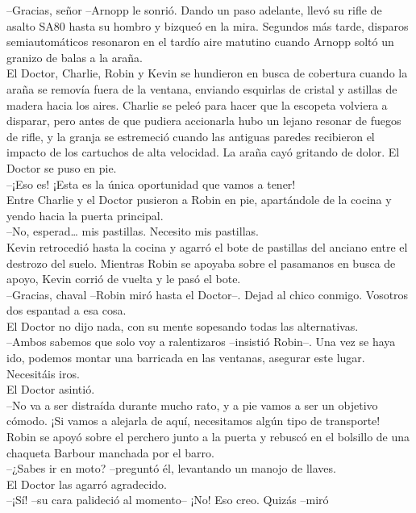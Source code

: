 --Gracias, señor --Arnopp le sonrió. Dando un paso adelante, llevó su
rifle de asalto SA80 hasta su hombro y bizqueó en la mira. Segundos más
tarde, disparos semiautomáticos resonaron en el tardío aire matutino
cuando Arnopp soltó un granizo de balas a la araña.\\[2\baselineskip]El
Doctor, Charlie, Robin y Kevin se hundieron en busca de cobertura cuando
la araña se removía fuera de la ventana, enviando esquirlas de cristal y
astillas de madera hacia los aires. Charlie se peleó para hacer que la
escopeta volviera a disparar, pero antes de que pudiera accionarla hubo
un lejano resonar de fuegos de rifle, y la granja se estremeció cuando
las antiguas paredes recibieron el impacto de los cartuchos de alta
velocidad. La araña cayó gritando de dolor. El Doctor se puso en pie.\\
--¡Eso es! ¡Esta es la única oportunidad que vamos a tener!\\
Entre Charlie y el Doctor pusieron a Robin en pie, apartándole de la
cocina y yendo hacia la puerta principal.\\
--No, esperad\ldots{} mis pastillas. Necesito mis pastillas.\\
Kevin retrocedió hasta la cocina y agarró el bote de pastillas del
anciano entre el destrozo del suelo. Mientras Robin se apoyaba sobre el
pasamanos en busca de apoyo, Kevin corrió de vuelta y le pasó el bote.\\
--Gracias, chaval --Robin miró hasta el Doctor--. Dejad al chico
conmigo. Vosotros dos espantad a esa cosa.\\
El Doctor no dijo nada, con su mente sopesando todas las alternativas.\\
--Ambos sabemos que solo voy a ralentizaros --insistió Robin--. Una vez
se haya ido, podemos montar una barricada en las ventanas, asegurar este
lugar. Necesitáis iros.\\
El Doctor asintió.\\
--No va a ser distraída durante mucho rato, y a pie vamos a ser un
objetivo cómodo. ¡Si vamos a alejarla de aquí, necesitamos algún tipo de
transporte!\\
Robin se apoyó sobre el perchero junto a la puerta y rebuscó en el
bolsillo de una chaqueta Barbour manchada por el barro.\\
--¿Sabes ir en moto? --preguntó él, levantando un manojo de llaves.\\
El Doctor las agarró agradecido.\\
--¡Sí! --su cara palideció al momento-- ¡No! Eso creo. Quizás --miró
